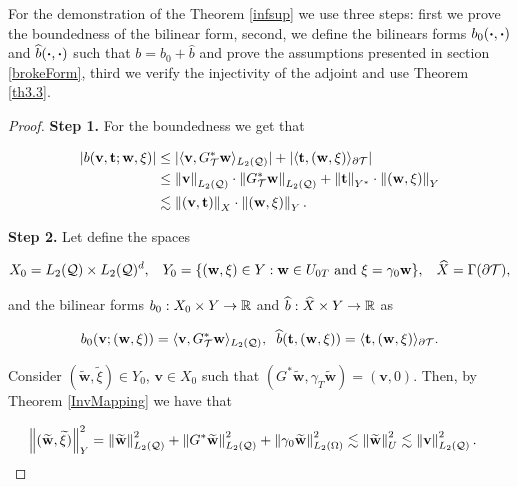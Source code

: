     For the demonstration of the Theorem \ref{infsup} we use three steps: first we prove the boundedness of the bilinear form, second, we define the bilinears forms $b_0(\boldsymbol{\cdot},\boldsymbol{\cdot})$ and $\widehat{b}(\boldsymbol{\cdot},\boldsymbol{\cdot})$ such that $b=b_0+\widehat{b}$ and prove the assumptions presented in section \ref{brokeForm}, third we verify the injectivity of the adjoint and use Theorem \ref{th3.3}.
    
\begin{proof}
     \textbf{Step 1.} For the boundedness we get that

    \begin{align*}
        |b(\mathbf{v},\mathbf{t};\mathbf{w},\xi)|&\leq |\langle \mathbf{v} , G^*_{\mathcal{T}}\mathbf{w} \rangle_{L_2(\mathcal{Q})}|+|\langle \mathbf{t} , (\mathbf{w},\xi) \rangle_{\partial\mathcal{T}}|\\&\leq \left\lVert\mathbf{v} \right\rVert_{L_2(\mathcal{Q})}\cdot\left\lVert G^*_{\mathcal{T}}\mathbf{w} \right\rVert_{L_2(\mathcal{Q})}+\left\lVert\mathbf{t} \right\rVert_{Y^*}\cdot\left\lVert(\mathbf{w},\xi) \right\rVert_Y\\&\lesssim \left\lVert(\mathbf{v},\mathbf{t}) \right\rVert_X\cdot\left\lVert(\mathbf{w},\xi) \right\rVert_Y.
    \end{align*}

    \textbf{Step 2.} Let define the spaces 

    $$X_0=L_2(\mathcal{Q})\times L_2(\mathcal{Q})^d,\hspace{0.3 cm}Y_0=\{(\mathbf{w},\xi)\in Y: \mathbf{w}\in U_{0T}\text{ and }\xi=\gamma_0\mathbf{w}\}, \hspace{0.3 cm}\widehat{X}=\Gamma(\partial\mathcal{T}),$$

    and the bilinear forms $b_0:X_0\times Y\to\mathbb{R}$ and $\widehat{b}:\widehat{X}\times Y\to\mathbb{R}$ as
    
    $$b_0(\mathbf{v};(\mathbf{w},\xi))=\langle \mathbf{v} , G^*_{\mathcal{T}}\mathbf{w} \rangle_{L_2(\mathcal{Q})},\hspace{0.2 cm}\widehat{b}(\mathbf{t},(\mathbf{w},\xi))=\langle \mathbf{t} , (\mathbf{w},\xi) \rangle_{\partial\mathcal{T}}.$$

    
    Consider $(\widetilde{\mathbf{w}},\widetilde{\xi})\in Y_0$, $\mathbf{v}\in X_0$ such that $(G^*\widetilde{\mathbf{w}},\gamma_T\widetilde{\mathbf{w}})=(\mathbf{v},0)$. Then, by Theorem \ref{InvMapping} we have that

    \begin{align*}
        \left\lVert(\widetilde{\mathbf{w}},\widetilde{\xi}) \right\rVert^2_Y&=\left\lVert\widetilde{\mathbf{w}} \right\rVert_{L_2(\mathcal{Q})}^2+\left\lVert G^*\widetilde{\mathbf{w}} \right\rVert_{L_2(\mathcal{Q})}^2+\left\lVert\gamma_0\widetilde{\mathbf{w}} \right\rVert_{L_2(\Omega)}^2\lesssim\left\lVert\widetilde{\mathbf{w}} \right\rVert^2_U\lesssim \left\lVert\mathbf{v} \right\rVert^2_{L_2(\mathcal{Q})}.
    \end{align*}


\end{proof}
